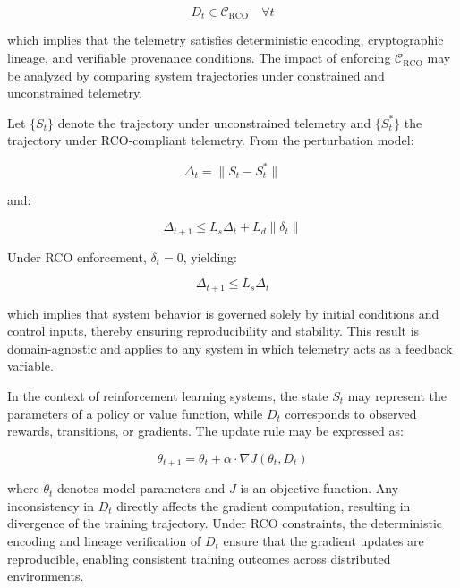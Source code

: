 \begin{equation}
D_t \in \mathcal{C}_{\text{RCO}} \quad \forall t
\end{equation}

which implies that the telemetry satisfies deterministic encoding, cryptographic lineage, and verifiable provenance conditions. The impact of enforcing $\mathcal{C}_{\text{RCO}}$ may be analyzed by comparing system trajectories under constrained and unconstrained telemetry.

Let $\{S_t\}$ denote the trajectory under unconstrained telemetry and $\{S_t^*\}$ the trajectory under RCO-compliant telemetry. From the perturbation model:

\begin{equation}
\Delta_t = \|S_t - S_t^*\|
\end{equation}

and:

\begin{equation}
\Delta_{t+1} \leq L_s \Delta_t + L_d \|\delta_t\|
\end{equation}

Under RCO enforcement, $\delta_t = 0$, yielding:

\begin{equation}
\Delta_{t+1} \leq L_s \Delta_t
\end{equation}

which implies that system behavior is governed solely by initial conditions and control inputs, thereby ensuring reproducibility and stability. This result is domain-agnostic and applies to any system in which telemetry acts as a feedback variable.

In the context of reinforcement learning systems, the state $S_t$ may represent the parameters of a policy or value function, while $D_t$ corresponds to observed rewards, transitions, or gradients. The update rule may be expressed as:

\begin{equation}
\theta_{t+1} = \theta_t + \alpha \cdot \nabla J(\theta_t, D_t)
\end{equation}

where $\theta_t$ denotes model parameters and $J$ is an objective function. Any inconsistency in $D_t$ directly affects the gradient computation, resulting in divergence of the training trajectory. Under RCO constraints, the deterministic encoding and lineage verification of $D_t$ ensure that the gradient updates are reproducible, enabling consistent training outcomes across distributed environments.

